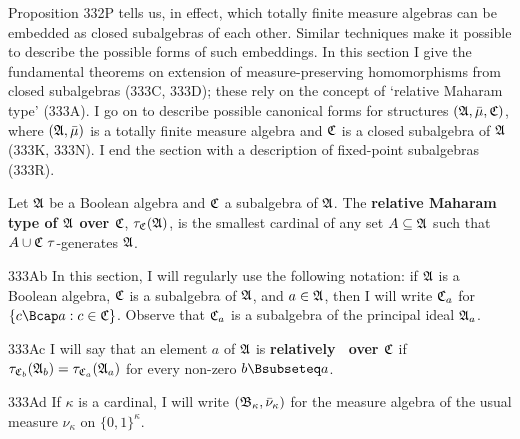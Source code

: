 
\def\chaptername{Maharam's theorem}
\def\sectionname{Closed subalgebras}


Proposition 332P tells us, in effect, which totally finite measure
algebras can be
embedded as closed subalgebras of each other.   Similar techniques make
it possible to describe the possible forms of such embeddings.   In this
section I give the fundamental theorems on extension of
measure-preserving homomorphisms from closed subalgebras (333C, 333D);
these rely on the concept of `relative Maharam type' (333A).   I go on
to describe possible canonical forms for structures
$(\frak A,\bar\mu,\frak C)$, where $(\frak A,\bar\mu)$ is a totally
finite measure algebra and
$\frak C$ is a closed subalgebra of $\frak A$ (333K, 333N).   I end the
section with a description of fixed-point subalgebras (333R).

 Let $\frak A$ be a Boolean algebra and
$\frak C$ a subalgebra of $\frak A$.   The {\bf relative Maharam type of
$\frak A$ over $\frak C$}, $\tau_{\frak C}(\frak A)$, is the smallest
cardinal of any set $A\subseteq\frak A$ such that
$A\cup\frak C\,\,\tau$-generates $\frak A$.

\spheader 333Ab In this section, I will regularly use the following
notation:
if $\frak A$ is a Boolean algebra, $\frak C$ is a subalgebra of
$\frak A$, and $a\in\frak A$, then I will write $\frak C_a$ for
$\{c\Bcap a:c\in\frak C\}$.   Observe that $\frak C_a$ is a subalgebra of
the principal ideal $\frak A_a$.

\spheader 333Ac I will say that an element $a$ of
$\frak A$ is {\bf relatively \Mth\ over $\frak C$} if
$\tau_{\frak C_b}(\frak A_b)=\tau_{\frak C_a}(\frak A_a)$ for every
non-zero $b\Bsubseteq a$.

\spheader 333Ad If $\kappa$ is a cardinal,
I will write $(\frak B_{\kappa},\bar\nu_{\kappa})$ for the measure algebra
of the usual measure $\nu_{\kappa}$ on $\{0,1\}^{\kappa}$.   

